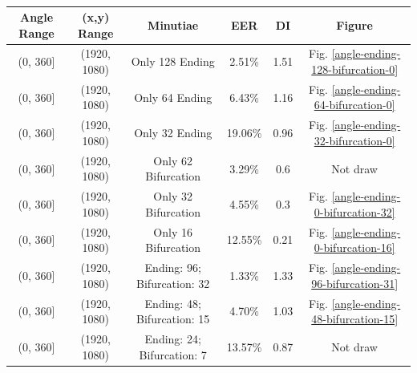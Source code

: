 \begin{table}[h!]
    \centering
    \caption{}
    \begin{tabular}{cccccc}
    \hline
    Angle Range & (x,y) Range  & Minutiae                    & EER     & DI   & Figure \\ \hline
    (0, 360{]}  & (1920, 1080) & Only 128 Ending             & 2.51\%  & 1.51 & Fig. \ref{angle-ending-128-bifurcation-0}  \\
    (0, 360{]}  & (1920, 1080) & Only 64 Ending              & 6.43\%  & 1.16 & Fig. \ref{angle-ending-64-bifurcation-0}  \\
    (0, 360{]}  & (1920, 1080) & Only 32 Ending              & 19.06\% & 0.96 & Fig. \ref{angle-ending-32-bifurcation-0}  \\
    (0, 360{]}  & (1920, 1080) & Only 62 Bifurcation         & 3.29\%  & 0.6  & Not draw  \\
    (0, 360{]}  & (1920, 1080) & Only 32 Bifurcation         & 4.55\%  & 0.3  & Fig. \ref{angle-ending-0-bifurcation-32}  \\
    (0, 360{]}  & (1920, 1080) & Only 16 Bifurcation         & 12.55\% & 0.21 & Fig. \ref{angle-ending-0-bifurcation-16}  \\
    (0, 360{]}  & (1920, 1080) & Ending: 96; Bifurcation: 32 & 1.33\%  & 1.33 & Fig. \ref{angle-ending-96-bifurcation-31} \\
    (0, 360{]}  & (1920, 1080) & Ending: 48; Bifurcation: 15 & 4.70\%  & 1.03 & Fig. \ref{angle-ending-48-bifurcation-15} \\
    (0, 360{]}  & (1920, 1080) & Ending: 24; Bifurcation: 7  & 13.57\% & 0.87 & Not draw \\ \hline
    \end{tabular}
    \label{angle-text-table}
\end{table}


